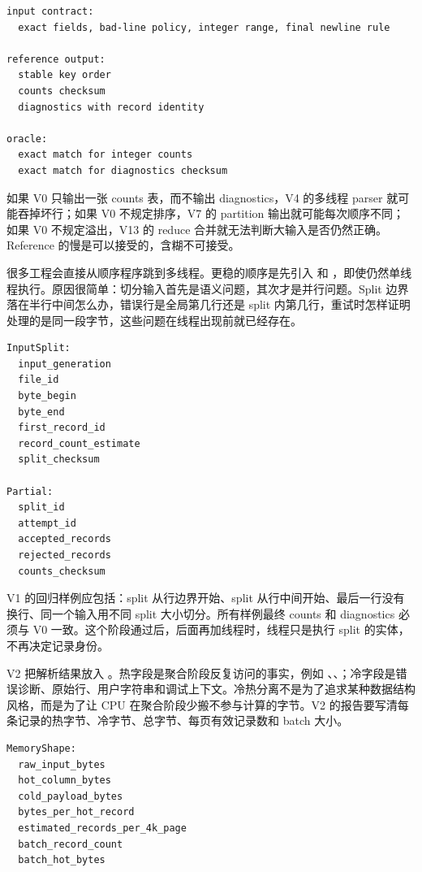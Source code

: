\begin{lstlisting}[numbers=none,caption={V0 需要先钉住的语义}]
input contract:
  exact fields, bad-line policy, integer range, final newline rule

reference output:
  stable key order
  counts checksum
  diagnostics with record identity

oracle:
  exact match for integer counts
  exact match for diagnostics checksum
\end{lstlisting}

如果 V0 只输出一张 counts 表，而不输出 diagnostics，V4 的多线程 parser 就可能吞掉坏行；如果 V0 不规定排序，V7 的 partition 输出就可能每次顺序不同；如果 V0 不规定溢出，V13 的 reduce 合并就无法判断大输入是否仍然正确。Reference 的慢是可以接受的，含糊不可接受。

很多工程会直接从顺序程序跳到多线程。更稳的顺序是先引入  和 ，即使仍然单线程执行。原因很简单：切分输入首先是语义问题，其次才是并行问题。Split 边界落在半行中间怎么办，错误行是全局第几行还是 split 内第几行，重试时怎样证明处理的是同一段字节，这些问题在线程出现前就已经存在。

\begin{lstlisting}[numbers=none,caption={V1 的 split 审计字段}]
InputSplit:
  input_generation
  file_id
  byte_begin
  byte_end
  first_record_id
  record_count_estimate
  split_checksum

Partial:
  split_id
  attempt_id
  accepted_records
  rejected_records
  counts_checksum
\end{lstlisting}

V1 的回归样例应包括：split 从行边界开始、split 从行中间开始、最后一行没有换行、同一个输入用不同 split 大小切分。所有样例最终 counts 和 diagnostics 必须与 V0 一致。这个阶段通过后，后面再加线程时，线程只是执行 split 的实体，不再决定记录身份。

V2 把解析结果放入 。热字段是聚合阶段反复访问的事实，例如 、、；冷字段是错误诊断、原始行、用户字符串和调试上下文。冷热分离不是为了追求某种数据结构风格，而是为了让 CPU 在聚合阶段少搬不参与计算的字节。V2 的报告要写清每条记录的热字节、冷字节、总字节、每页有效记录数和 batch 大小。

\begin{lstlisting}[numbers=none,caption={V2 的 MemoryShape 摘要}]
MemoryShape:
  raw_input_bytes
  hot_column_bytes
  cold_payload_bytes
  bytes_per_hot_record
  estimated_records_per_4k_page
  batch_record_count
  batch_hot_bytes
\end{lstlisting}

